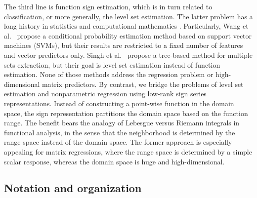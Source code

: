 \documentclass[aos]{imsart}
\theoremstyle{definition}
\begin{document}
The third line is function sign estimation, which is in turn related to classification, or more generally, the level set estimation. The latter problem has a long history in statistics \citep{tsybakov1997nonparametric} and computational mathematics \citep{gibou2018review}. Particularly, Wang et al.~\cite{wang2008probability} propose a conditional probability estimation method based on support vector machines (SVMs), but their results are restricted to a fixed number of features and vector predictors only. Singh et al.~\cite{singh2009adaptive} propose a tree-based method for multiple sets extraction, but their goal is level set estimation instead of function estimation. None of those methods address the regression problem or high-dimensional matrix predictors. By contrast, we bridge the problems of level set estimation and nonparametric regression using low-rank sign series representations. Instead of constructing a point-wise function in the domain space, the sign representation partitions the domain space based on the function range. The benefit bears the analogy of Lebesgue versus Riemann integrals in functional analysis, in the sense that the neighborhood is determined by the range space instead of the domain space. The former approach is especially appealing for matrix regressions, where the range space is determined by a simple scalar response, whereas the domain space is huge and high-dimensional. 

\subsection{Notation and organization}
\end{document}
